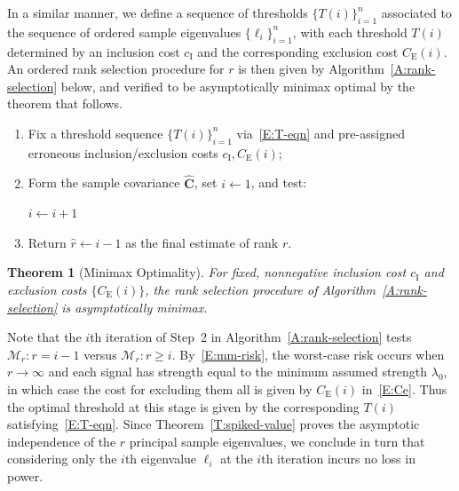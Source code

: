 \documentclass[final]{IEEEtran}
\newtheorem{theorem}{Theorem}
\newcommand{\matrixsymbol}{\boldsymbol}
\newcommand{\mhC}{\widehat{\matrixsymbol{C}}}
\newcommand{\ulambda}{\lambda_0}
\newcommand{\Ce}{C_\text{E}}
\newcommand{\ci}{c_\text{I}}
\begin{document}
In a similar manner, we define a sequence of thresholds $\{T(i)\}_{i=1}^n$ associated to the sequence of ordered sample eigenvalues $\{\ell_i\}_{i=1}^n$, with each threshold $T(i)$ determined by an inclusion cost $\ci$ and the corresponding exclusion cost $\Ce(i)$.  An ordered rank selection procedure for $r$ is then given by Algorithm~\ref{A:rank-selection} below, and verified to be asymptotically minimax optimal by the theorem that follows.
\begin{algorithm}
\caption{\label{A:rank-selection}Minimax-optimal rank selection procedure}
\begin{enumerate}
\item Fix a threshold sequence $\{T(i)\}_{i=1}^n$ via~\eqref{E:T-eqn} and pre-assigned erroneous inclusion/exclusion costs $\ci, \Ce(i)$;
\item Form the sample covariance $\mhC$, set $i \leftarrow 1$, and test:

    \begin{algorithmic}
    \WHILE{ $\ell_{i}(\mhC) > T( i )$ }
        \STATE $i \leftarrow i + 1$
    \ENDWHILE
\end{algorithmic}
\item Return $\hat r \leftarrow i - 1$ as the final estimate of rank $r$.
\end{enumerate}
\end{algorithm}%

\begin{theorem}[Minimax Optimality]\label{T:mm-opt} For fixed, nonnegative inclusion cost $\ci$ and exclusion
costs $\{\Ce(i)\}$, the rank selection procedure of Algorithm~\ref{A:rank-selection} is asymptotically minimax.
\end{theorem}

\begin{IEEEproof}
Note that the $i$th iteration of Step~2 in Algorithm~\ref{A:rank-selection} tests $\mathcal{M}_r: r = i-1$ versus $\mathcal{M}_r: r \geq i$.  By~\eqref{E:mm-risk}, the worst-case risk occurs when $r \to \infty$ and each signal has strength equal to the minimum assumed strength $\ulambda$, in which case the cost for excluding them all is given by $\Ce(i)$ in~\eqref{E:Ce}. Thus the optimal threshold at this stage is given by the corresponding $T(i)$ satisfying~\eqref{E:T-eqn}.  Since Theorem~\ref{T:spiked-value} proves the asymptotic independence of the $r$ principal sample eigenvalues, we conclude in turn that considering only the $i$th eigenvalue $\ell_i$ at the $i$th iteration incurs no loss in power.
\end{IEEEproof}
\end{document}
